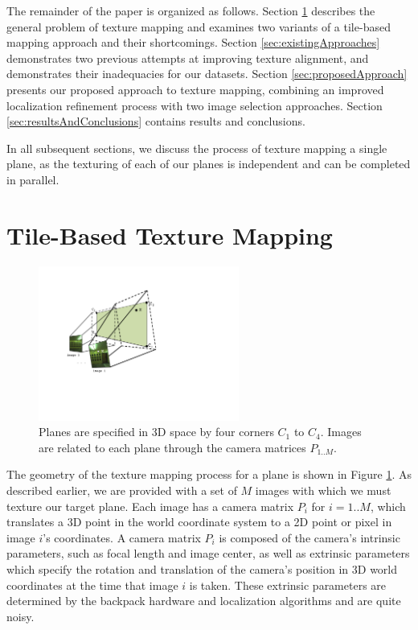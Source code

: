 \documentclass[10pt,twocolumn,letterpaper]{article}
\begin{document}
The remainder of the paper is organized as follows. Section
\ref{sec:simpleTextureMapping} describes the general problem of
texture mapping and examines two variants of a tile-based mapping approach and their
shortcomings.  Section \ref{sec:existingApproaches} demonstrates two
previous attempts at improving texture alignment, and demonstrates their
inadequacies for our datasets.  Section \ref{sec:proposedApproach}
presents our proposed approach to texture mapping, combining an
improved localization refinement process with two image selection
approaches. Section \ref{sec:resultsAndConclusions} contains results
and conclusions.

In all subsequent sections, we discuss the process of texture mapping
a single plane, as the texturing of each of our planes is independent
and can be completed in parallel.

\section{Tile-Based Texture Mapping}
\label{sec:simpleTextureMapping}
\begin{figure}
  \centering
  \includegraphics[height=2in]{Projection.pdf}
  \caption{Planes are specified in 3D space by four corners $C_1$ to
    $C_4$. Images are related to each plane through the camera
    matrices $P_{1..M}$. }
  \label{fig:projection}
\end{figure}

The geometry of the texture mapping process for a plane is shown in
Figure \ref{fig:projection}.  As described earlier, we are provided
with a set of $M$ images with which we must texture our target
plane. Each image has a camera matrix $P_i$ for $i=1..M$, which
translates a 3D point in the world coordinate system to a 2D point or
pixel in image $i$'s coordinates. A camera matrix $P_i$ is composed of
the camera's intrinsic parameters, such as focal length and image
center, as well as extrinsic parameters which specify the rotation and
translation of the camera's position in 3D world coordinates at the
time that image $i$ is taken. These extrinsic parameters are
determined by the backpack hardware and localization algorithms
\cite{chen2010indoor, liu2010indoor, kua2012loopclosure} and are quite
noisy.
\end{document}

